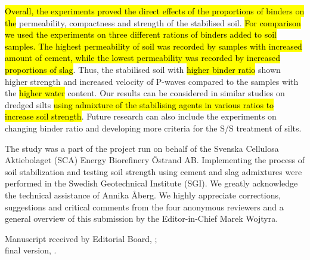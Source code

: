 \documentclass{amestyle}
\begin{document}
\hl{Overall, the experiments proved the direct effects of the proportions of binders on the} permeability, compactness and strength of the stabilised soil. \hl{For comparison we used the experiments on three different rations of binders added to soil samples. The highest permeability of soil was recorded by samples with increased amount of cement, while the lowest permeability was recorded by increased proportions of slag}. Thus, the stabilised soil with \hl{higher binder ratio} shown higher strength and increased velocity of P-waves compared to the samples with the \hl{higher water} content. Our results can be considered in similar studies on dredged silts \hl{using admixture of the stabilising agents in various ratios to increase soil strength}. Future research can also include the experiments on changing binder ratio and developing more criteria for the S/S treatment of silts.

\begin{acknowledgements}
The study was a part of the project run on behalf of the Svenska Cellulosa Aktiebolaget (SCA) Energy Biorefinery \"Ostrand AB. Implementing the process of soil stabilization and testing soil strength using cement and slag admixtures were performed in the Swedish Geotechnical Institute (SGI).
We greatly acknowledge the technical assistance of Annika Åberg. We highly appreciate corrections, suggestions and critical comments from the four anonymous reviewers and a general overview of this submission by the Editor-in-Chief Marek Wojtyra.
\end{acknowledgements}

\begin{receiptnote}
  Manuscript received by Editorial Board, \theamereceived; \\ 
  final version, \theameaccepted.
\end{receiptnote}



%
%

%
%

\end{document}
